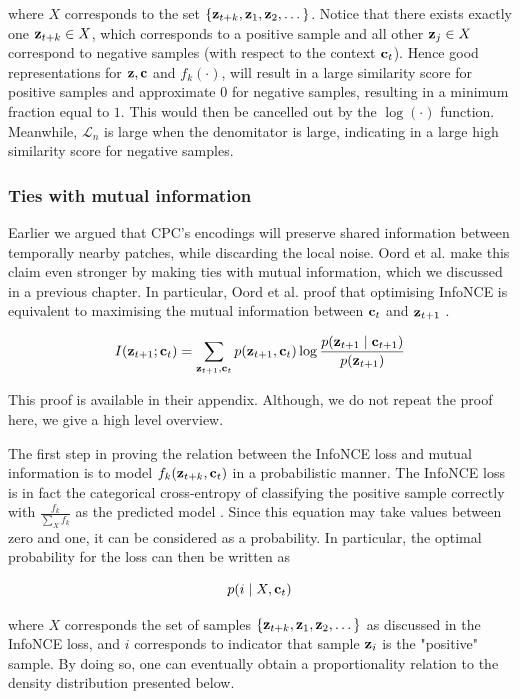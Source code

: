 	where $X$ corresponds to the set ${ \left\{ \mathbf{z}_{t+k}, \mathbf{z}_1, \mathbf{z}_2, \dots \right\} }$. Notice that there exists exactly one $\mathbf{z}_{t+k} \in X$, which corresponds to a positive sample and all other $\mathbf{z}_j \in X$ correspond to negative samples (with respect to the context $\mathbf{c}_t$).  Hence good representations for $\mathbf{z}, \mathbf{c}$ and $f_k(\cdot)$, will result in a large similarity score for positive samples and approximate $0$ for negative samples, resulting in a minimum fraction equal to $1$. This would then be cancelled out by the $\log(\cdot)$ function. Meanwhile, $\mathcal{L}_n$ is large when the denomitator is large, indicating in a large high similarity score for negative samples.
	
\subsubsection{Ties with mutual information}
	Earlier we argued that CPC's encodings will preserve shared information between temporally nearby patches, while discarding the local noise. Oord et al. make this claim even stronger by making ties with mutual information, which we discussed in a previous chapter. In particular, Oord et al. proof that optimising InfoNCE is equivalent to maximising the mutual information between $\mathbf{c}_t$ and $\mathbf{z}_{t+1}$ \cite{oordRepresentationLearningContrastive2019}. 
	
	\begin{equation} %
		I(\ztone; \ct) = \sum_{\ztone, \ct} p(\ztone, \ct) \log \frac{p(\ztone \mid \ctone)}{p(\ztone)}
	\end{equation}
	
	This proof is available in their appendix. Although, we do not repeat the proof here, we give a high level overview.
	
	The first step in proving the relation between the InfoNCE loss and mutual information is to model $f_k(\mathbf{z}_{t+k}, \mathbf{c}_t)$ in a probabilistic manner. The InfoNCE loss is in fact the categorical cross-entropy of classifying the positive sample correctly with $\frac{f_k}{\sum_{X} f_k}$ as the predicted model \cite{oordRepresentationLearningContrastive2019}. Since this equation may take values between zero and one, it can be considered as a probability. In particular, the optimal probability for the loss can then be written as 

	$$p(i \mid X, \mathbf{c}_t)$$
	
	where $X$ corresponds the set of samples  ${ \left\{ \mathbf{z}_{t+k}, \mathbf{z}_1, \mathbf{z}_2, \dots \right\} }$  as discussed in the InfoNCE loss, and $i$ corresponds to indicator that sample $\mathbf{z}_i$ is the "positive" sample. By doing so, one can eventually obtain a proportionality relation to the density distribution presented below. 
	
